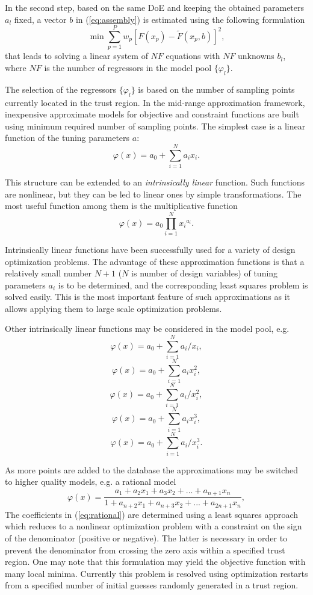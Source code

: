 \documentclass[runningheads,a4paper]{llncs}
\begin{document}
In the second step, based on the same DoE and keeping the obtained parameters $a_l$ fixed, a vector $b$ in (\ref{eq:assembly}) is estimated using the following formulation
\[
\min \sum_{p=1}^P{w_{p}\left[ F(x_p)- \widetilde{F}(x_p,b) \right]^2},
\]
that leads to solving a linear system of $NF$ equations with $NF$ unknowns $b_l$, where $NF$ is the number of regressors in the model pool $\{\varphi_l\}$.

The selection of the regressors $\{\varphi_l\}$ is based on the number of sampling points currently located in the trust region. In the mid-range approximation framework, inexpensive approximate models for objective and constraint functions are built using minimum required number of sampling points. The simplest case is a linear function of the tuning parameters $a$:
\[
\varphi(x) = a_0 + \sum_{i=1}^N{a_i x_i}.
\]

This structure can be extended to an \textit{intrinsically linear} function. Such functions are nonlinear, but they can be led to linear ones by simple transformations. The most useful function among them is the multiplicative function
\[
\varphi(x) = a_0 \prod_{i=1}^N{x{_i}^{a_i}}.
\]

Intrinsically linear functions have been successfully used for a variety of design optimization problems. 
The advantage of these approximation functions is that a relatively small number $N+1$ ($N$ is number of design variables) of tuning parameters $a_i$ is to be determined, and the corresponding least squares problem is solved easily. This is the most important feature of such approximations as it allows applying them to large scale optimization problems.

Other intrinsically linear functions may be considered in the model pool, e.g.
\[
\varphi(x) = a_0 + \sum_{i=1}^N{a_i/x_i},
\]
\[
\varphi(x) = a_0 + \sum_{i=1}^N{a_i x_i^2},
\]
\[
\varphi(x) = a_0 + \sum_{i=1}^N{a_i/x_i^2},
\]
\[
\varphi(x) = a_0 + \sum_{i=1}^N{a_i x_i^3},
\]
\[
\varphi(x) = a_0 + \sum_{i=1}^N{a_i/x_i^3}.
\]

As more points are added to the database the approximations may be switched to higher quality models, e.g. a rational model
\begin{equation}\label{eq:rational}
\varphi(x) = \frac{a_1 + a_2x_1 + a_3x_2+...+a_{n+1}x_n}{1 + a_{n+2}x_1 + a_{n+3}x_2+...+a_{2n+1}x_n},
\end{equation}
The coefficients in (\ref{eq:rational}) are determined using a least squares approach which reduces to a nonlinear optimization problem with a constraint on the sign of the denominator (positive or negative). The latter is necessary in order to prevent the denominator from crossing the zero axis within a specified trust region. One may note that this formulation may yield the objective function with many local minima. Currently this problem is resolved using optimization restarts from a specified number of initial guesses randomly generated in a trust region.
\end{document}
